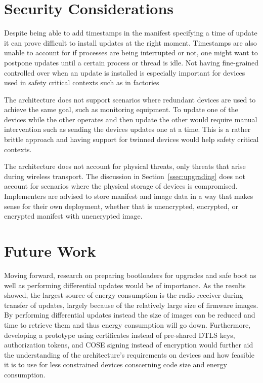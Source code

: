 \documentclass[0-thesis.tex]{subfiles}
\begin{document}
\section{Security Considerations}
\label{sec:security-considerations}
Despite being able to add timestamps in the manifest specifying a time of update it can
prove difficult to install updates at the right moment. Timestamps are also unable to
account for if processes are being interrupted or not, one might want to postpone updates
until a certain process or thread is idle. Not having fine-grained controlled over when an
update is installed is especially important for devices used in safety critical contexts
such as in factories

The architecture does not support scenarios where redundant devices are used to achieve
the same goal, such as monitoring equipment. To update one of the devices while the other
operates and then update the other would require manual intervention such as sending the
devices updates one at a time. This is a rather brittle approach and having support for
twinned devices would help safety critical contexts.

The architecture does not account for physical threats, only threats that arise during
wireless transport. The discussion in Section~\ref{ssec:upgrading} does not account for
scenarios where the physical storage of devices is compromised. Implementers are advised
to store manifest and image data in a way that makes sense for their own deployment,
whether that is unencrypted, encrypted, or encrypted manifest with unencrypted image.

\section{Future Work}
\label{sec:future-work}
Moving forward, research on preparing bootloaders for upgrades and safe boot as well as
performing differential updates would be of importance. As the results showed, the largest
source of energy consumption is the radio receiver during transfer of updates, largely
because of the relatively large size of firmware images. By performing differential
updates instead the size of images can be reduced and time to retrieve them and thus
energy consumption will go down. Furthermore, developing a prototype using certificates
instead of pre-shared DTLS keys, authorization tokens, and COSE signing instead of
encryption would further aid the understanding of the architecture's requirements on
devices and how feasible it is to use for less constrained devices conscerning code size
and energy consumption. 
\end{document}
